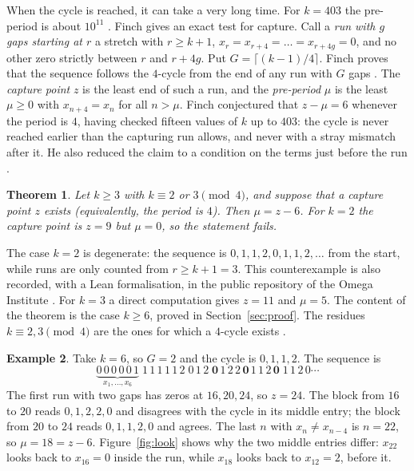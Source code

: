 \documentclass[11pt]{amsart}
\newtheorem{thm}{Theorem}
\theoremstyle{definition}
\newtheorem{example}[thm]{Example}
\begin{document}
When the cycle is reached, it can take a very long time. For $k=403$ the pre-period is about $10^{11}$
\cite{F26}. Finch gives an exact test for capture. Call a \emph{run with $g$ gaps starting at $r$} a stretch
with $r\ge k+1$, $x_r=x_{r+4}=\dots=x_{r+4g}=0$, and no other zero strictly between $r$ and $r+4g$. Put
$G=\lceil (k-1)/4\rceil$. Finch proves that the sequence follows the $4$-cycle from the end of any run with $G$
gaps \cite[Prop.~13]{F26}. The \emph{capture point} $z$ is the least end of such a run, and the
\emph{pre-period} $\mu$ is the least $\mu\ge0$ with $x_{n+4}=x_n$ for all $n>\mu$. Finch conjectured
\cite[Conj.~23]{F26} that $z-\mu=6$ whenever the period is $4$, having checked fifteen values of $k$ up to $403$:
the cycle is never reached earlier than the capturing run allows, and never with a stray mismatch after it. He
also reduced the claim to a condition on the terms just before the run \cite[Remark~24]{F26}.

\begin{thm}\label{thm:main}
Let $k\ge3$ with $k\equiv2$ or $3\pmod4$, and suppose that a capture point $z$ exists (equivalently, the
period is $4$). Then $\mu=z-6$. For $k=2$ the capture point is $z=9$ but $\mu=0$, so the statement fails.
\end{thm}

The case $k=2$ is degenerate: the sequence is $0,1,1,2,0,1,1,2,\dots$ from the start, while runs are only counted
from $r\ge k+1=3$. This counterexample is also recorded, with a Lean formalisation, in the public repository of
the Omega Institute \cite{Om}. For $k=3$ a direct computation gives $z=11$ and $\mu=5$. The content of the theorem is the case
$k\ge6$, proved in Section~\ref{sec:proof}. The residues $k\equiv2,3\pmod4$ are the ones for which a
$4$-cycle exists \cite[Prop.~12]{F26}.

\begin{example}\label{ex:six}
Take $k=6$, so $G=2$ and the cycle is $0,1,1,2$. The sequence is
\[
\underbrace{0\,0\,0\,0\,0\,1}_{x_1,\dots,x_6}\;1\,1\,1\,1\,1\,2\;0\,1\,2\;\mathbf{0}\,1\,2\,2\,\mathbf{0}\,1\,1\,2\,\mathbf{0}\;1\,1\,2\,0\cdots
\]
The first run with two gaps has zeros at $16,20,24$, so $z=24$. The block from $16$ to $20$ reads $0,1,2,2,0$ and
disagrees with the cycle in its middle entry; the block from $20$ to $24$ reads $0,1,1,2,0$ and agrees. The last
$n$ with $x_n\neq x_{n-4}$ is $n=22$, so $\mu=18=z-6$. Figure~\ref{fig:look} shows why the two middle entries
differ: $x_{22}$ looks back to $x_{16}=0$ inside the run, while $x_{18}$ looks back to $x_{12}=2$, before it.
\end{example}
\end{document}
